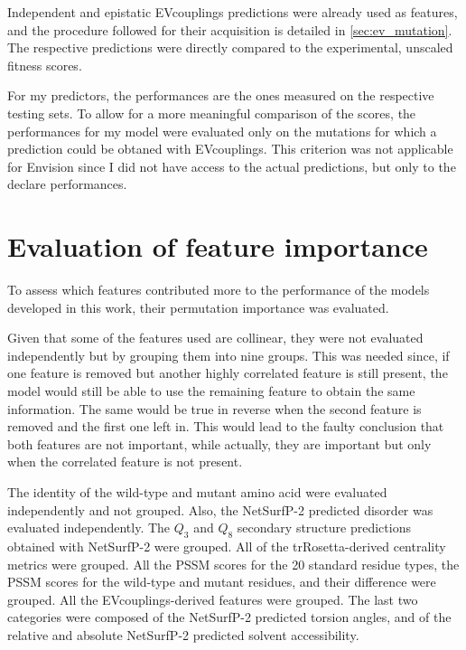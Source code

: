 Independent and epistatic EVcouplings predictions were already used as features, and the procedure followed for their acquisition is detailed in \cref{sec:ev_mutation}.
The respective predictions were directly compared to the experimental, unscaled fitness scores.

For my predictors, the performances are the ones measured on the respective testing sets.
To allow for a more meaningful comparison of the scores, the performances for my model were evaluated only on the mutations for which a prediction could be obtaned with EVcouplings.
This criterion was not applicable for Envision since I did not have access to the actual predictions, but only to the declare performances.

\section{Evaluation of feature importance}\label{sec:mm_feature_importance}
To assess which features contributed more to the performance of the models developed in this work, their permutation importance was evaluated.

Given that some of the features used are collinear, they were not evaluated independently but by grouping them into nine groups.
This was needed since, if one feature is removed but another highly correlated feature is still present, the model would still be able to use the remaining feature to obtain the same information.
The same would be true in reverse when the second feature is removed and the first one left in.
This would lead to the faulty conclusion that both features are not important, while actually, they are important but only when the correlated feature is not present.

The identity of the wild-type and mutant amino acid were evaluated independently and not grouped.
Also, the NetSurfP-2 predicted disorder was evaluated independently.
The $Q_3$ and $Q_8$ secondary structure predictions obtained with NetSurfP-2 were grouped.
All of the trRosetta-derived centrality metrics were grouped.
All the PSSM scores for the \num{20} standard residue types, the PSSM scores for the wild-type and mutant residues, and their difference were grouped.
All the EVcouplings-derived features were grouped.
The last two categories were composed of the NetSurfP-2 predicted torsion angles, and of the relative and absolute NetSurfP-2 predicted solvent accessibility.

